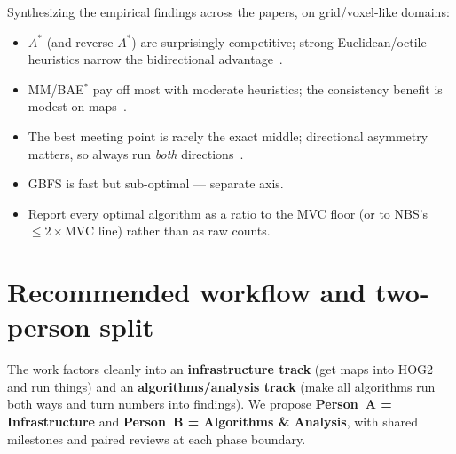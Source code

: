 \documentclass[11pt]{article}
\begin{document}
Synthesizing the empirical findings across the papers, on grid/voxel-like domains:
\begin{itemize}[leftmargin=1.4em,itemsep=1pt]
  \item $A^{*}$ (and reverse $A^{*}$) are surprisingly competitive; strong Euclidean/octile
        heuristics narrow the bidirectional advantage~\citep{holte2017mm,siag2025bridging}.
  \item MM/BAE$^{*}$ pay off most with moderate heuristics; the consistency benefit is
        modest on maps~\citep{shaham2018consistent,siag2025bridging}.
  \item The best meeting point is rarely the exact middle; directional asymmetry matters,
        so always run \emph{both} directions~\citep{shaham2017minimal,nobes2023voxel}.
  \item GBFS is fast but sub-optimal --- separate axis.
  \item Report every optimal algorithm as a ratio to the MVC floor (or to NBS's
        $\le2\times$MVC line) rather than as raw counts.
\end{itemize}

\section{Recommended workflow and two-person split}
\label{sec:workflow}

The work factors cleanly into an \textbf{infrastructure track} (get maps into HOG2 and run
things) and an \textbf{algorithms/analysis track} (make all algorithms run both ways and
turn numbers into findings). We propose \textbf{Person~A = Infrastructure} and
\textbf{Person~B = Algorithms \& Analysis}, with shared milestones and paired reviews at
each phase boundary.
\end{document}
